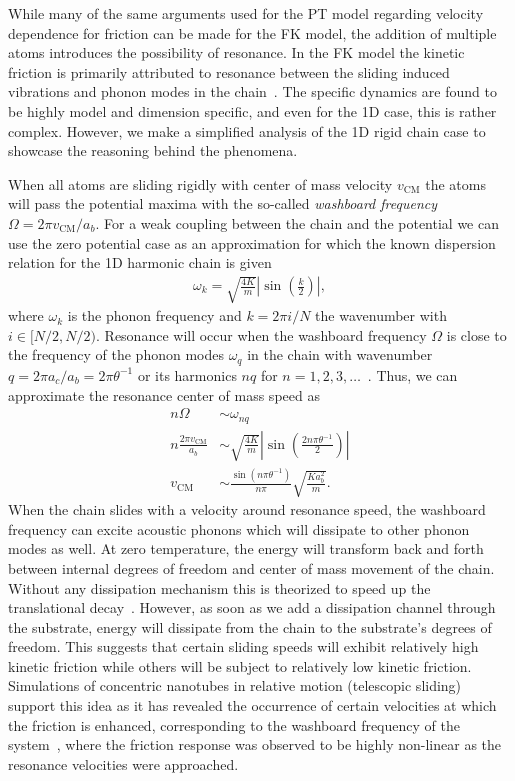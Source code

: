 While many of the same arguments used for the \acrshort{PT} model regarding velocity dependence for friction can be made for the \acrshort{FK} model, the addition of multiple atoms introduces the possibility of resonance. In the \acrshort{FK} model the kinetic friction is primarily attributed to resonance between the sliding induced vibrations and phonon modes in the chain~\cite{FK2D}. The specific dynamics are found to be highly model and dimension specific, and even for the 1D case, this is rather complex. However, we make a simplified analysis of the 1D rigid chain case to showcase the reasoning behind the phenomena.

When all atoms are sliding rigidly with center of mass velocity $v_{{\text{CM}}}$ the atoms will pass the potential maxima with the so-called \textit{washboard frequency} $\Omega = 2\pi v_{{\text{CM}}} / a_b$. For a weak coupling between the chain and the potential we can use the zero potential case as an approximation for which the known dispersion relation for the 1D harmonic chain is given~\cite[p. 92]{Kittel2004}
\begin{align*}
  \omega_k = \sqrt{\frac{4 K}{m}} \left|\sin{\left(\frac{k}{2}\right)}\right|,
\end{align*}
where $\omega_k$ is the phonon frequency and $k = 2\pi i / N$ the wavenumber with $i\in [N/2, N/2)$. Resonance will occur when the washboard frequency $\Omega$ is close to the frequency of the phonon modes $\omega_q$ in the chain with wavenumber $q = 2\pi a_c / a_b = 2\pi \theta^{-1}$ or its harmonics $nq$ for $n = 1, 2, 3, \hdots$~\cite{van_den_Ende_2012}. Thus, we can approximate the resonance center of mass speed as
\begin{align*}
    n \Omega &\sim \omega_{nq} \\
    n \frac{2\pi v_{\text{CM}}}{a_b} &\sim \sqrt{\frac{4K}{m}} \left| \sin{\left(\frac{2n \pi \theta^{-1}}{2}\right)}\right| \\
    v_{\text{CM}} &\sim \frac{\sin{(n\pi \theta^{-1})}}{n \pi} \sqrt{\frac{Ka_b^2}{m}}.
\end{align*}
When the chain slides with a velocity around resonance speed, the washboard
frequency can excite acoustic phonons which will dissipate to other phonon modes
as well. At zero temperature, the energy will transform back and forth between
internal degrees of freedom and center of mass movement of the chain. Without any dissipation mechanism this is theorized to speed up the translational decay~\cite{FK2D}. However, as soon as we add a dissipation channel through the substrate, energy will dissipate from the chain to the substrate's degrees of freedom. This suggests that certain sliding speeds will exhibit relatively high kinetic friction while
others will be subject to relatively low kinetic friction. Simulations of
concentric nanotubes in relative motion (telescopic sliding) support this idea as it has revealed the
occurrence of certain velocities at which the friction is enhanced, corresponding
to the washboard frequency of the system~\cite{Manini_2016}, where the friction response was observed to be highly non-linear as the resonance velocities were
approached. 

